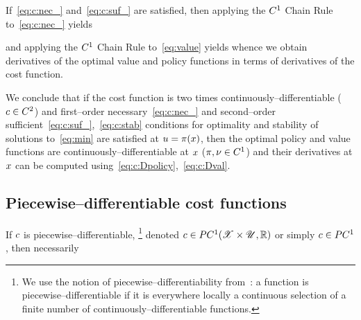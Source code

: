 \documentclass{article}
\begin{document}
If~\eqref{eq:c:nec_} and~\eqref{eq:c:suf_} are satisfied, then 
applying the $C^1$ Chain Rule~\citep[Prop.~C.3]{Lee2012-mb} to~\eqref{eq:c:nec_} yields

and applying the $C^1$ Chain Rule to~\eqref{eq:value} yields
\eqnn{\label{eq:c:Dval}
\D\val(\state) & = \D_\state \cost(\state,\policy(\state)) %
& = \D_1 \cost(\state,\policy(\state)) + \D_2 \cost(\state,\policy(\state)) \D\policy(\state),
}
whence we obtain derivatives of the optimal value and policy functions in terms of derivatives of the cost function.

We conclude that if the cost function is two times continuously--differentiable ($c\in C^2$) and first--order necessary~\eqref{eq:c:nec_} and second--order sufficient~\eqref{eq:c:suf_},~\eqref{eq:c:stab} conditions for optimality and stability of solutions to~\eqref{eq:min} are satisfied at $u = \pi(x)$, then the optimal policy and value functions are continuously--differentiable at $x$ ($\pi,\nu\in C^1$) and their derivatives at $x$ can be computed using~\eqref{eq:c:Dpolicy},~\eqref{eq:c:Dval}.



\subsection{Piecewise--differentiable cost functions}
\label{sec:value:pc}

If $c$ is piecewise--differentiable,%
\footnote{We use the notion of piecewise--differentiability from~\cite[Ch.~4.1]{Scholtes2012-la}: a function is piecewise--differentiable if it is everywhere locally a continuous selection of a finite number of continuously--differentiable functions.}
denoted $c\in PC^1(\mathscr{X}\times \mathscr{U},\mathbb{R})$ or simply $c\in PC^1$, then necessarily%
\end{document}
